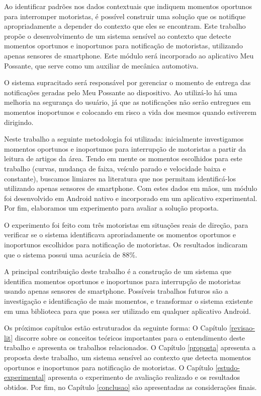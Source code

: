 Ao identificar padrões nos dados contextuais que indiquem momentos oportunos para interromper motoristas, é possível
construir uma solução que os notifique apropriadamente a depender do contexto que eles se encontram. Este trabalho propõe
o desenvolvimento de um sistema sensível ao contexto que detecte momentos oportunos e inoportunos para notificação de motoristas, utilizando
apenas sensores de smartphone. Este módulo será incorporado ao aplicativo Meu Possante, que serve como um auxiliar de mecânica automotiva.

O sistema supracitado será responsável por gerenciar o momento de entrega das notificações geradas pelo Meu Possante ao dispositivo. Ao
utilizá-lo há uma melhoria na segurança do usuário, já que as notificações não serão entregues em momentos inoportunos e
colocando em risco a vida dos mesmos quando estiverem dirigindo.

Neste trabalho a seguinte metodologia foi utilizada: inicialmente investigamos momentos oportunos e inoportunos para interrupção de motoristas
a partir da leitura de artigos da área. Tendo em mente os momentos escolhidos para este trabalho (curvas, mudança de faixa, veículo parado e
velocidade baixa e constante), buscamos limiares na literatura que nos permitam identificá-los utilizando apenas sensores de smartphone.
Com estes dados em mãos, um módulo foi desenvolvido em Android nativo e incorporado em um aplicativo experimental. Por fim, elaboramos um
experimento para avaliar a solução proposta.

O experimento foi feito com três motoristas em situações reais de direção, para verificar se o sistema identificava aproriadamente os momentos
oportunos e inoportunos escolhidos para notificação de motoristas. Os resultados indicaram que o sistema possui uma acurácia de 88\%.

A principal contribuição deste trabalho é a construção de um sistema que identifica momentos oportunos e inoportunos para interrupção de motoristas
usando apenas sensores de smartphone. Possíveis trabalhos futuros são a investigação e identificação de mais momentos, e transformar o sistema
existente em uma biblioteca para que possa ser utilizado em qualquer aplicativo Android.

Os próximos capítulos estão estruturados da seguinte forma: O Capítulo \ref{revisao-lit} discorre sobre os conceitos teóricos importantes para o
entendimento deste trabalho e apresenta os trabalhos relacionados. O Capítulo \ref{proposta} apresenta a proposta deste trabalho, um sistema
sensível ao contexto que detecta momentos oportunos e inoportunos para notificação de motoristas. O Capítulo \ref{estudo-experimental}
apresenta o experimento de avaliação realizado e os resultados obtidos. Por fim, no Capítulo \ref{conclusao} são apresentadas as considerações finais.
